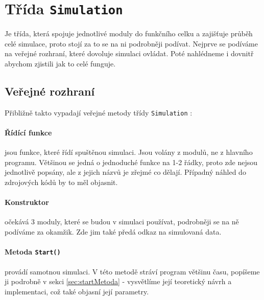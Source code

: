 
\section{Třída \texttt{Simulation}}
Je třída, která spojuje jednotlivé moduly do funkčního celku a zajišťuje průběh celé simulace, proto stojí za to se na ni podrobněji podívat. Nejprve se podíváme na veřejné rozhraní, které dovoluje simulaci ovládat. Poté nahlédneme i dovnitř abychom zjistili jak to celé funguje.
\subsection{Veřejné rozhraní}
Přibližně takto vypadají veřejné metody třídy \texttt{Simulation} :
\paragraph{Řídící funkce}
jsou funkce, které řídí spuštěnou simulaci. Jsou volány z modulů, ne z hlavního programu. Většinou se jedná o jednoduché funkce na 1-2 řádky, proto zde nejsou jednotlivě popsány, ale z jejich názvů je zřejmé co dělají. Případný náhled do zdrojových kódů by to měl objasnit.
\paragraph{Konstruktor}
očekává 3 moduly, které se budou v simulaci používat, podrobněji se na ně podíváme za okamžik. Zde jim také předá odkaz na simulovaná data.
\paragraph{Metoda \texttt{Start()}}
provádí samotnou simulaci. V této metodě stráví program většinu času, popíšeme ji podrobně v sekci \ref{sec:startMetoda} - vysvětlíme její teoretický návrh a implementaci, což také objasní její parametry.
